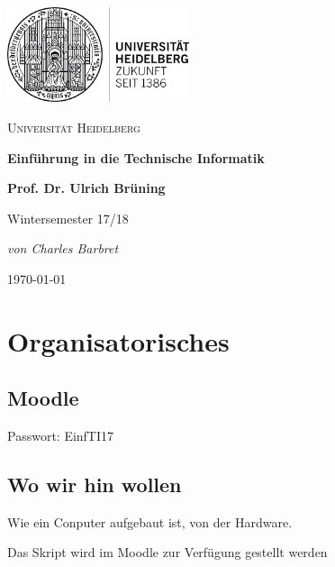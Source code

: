 \documentclass[12pt,a4paper]{article} %
\begin{document}
	\begin{titlepage} %
	\centering
	\includegraphics[width=0.40\textwidth]{UniLogo}\par\vspace{1cm}
		{\scshape\LARGE Universität Heidelberg \par}
		\vspace{1cm}
		{\huge\bfseries Einführung in die Technische Informatik \par}
		\vspace{1cm}
		{\Large\bfseries Prof. Dr. Ulrich Brüning \par}
		\vspace{1cm}
		{\huge Wintersemester 17/18 \par}
		\vspace{2cm}
		{\Large\itshape von Charles Barbret \par}
		
		\vfill

		{\large \gerDate\today\par}
	\end{titlepage}

\tableofcontents %
\newpage %


\section{Organisatorisches}
\subsection{Moodle}
Passwort: EinfTI17

\subsection{Wo wir hin wollen}
Wie ein Conputer aufgebaut ist, von der Hardware.

Das Skript wird im Moodle zur Verfügung gestellt werden
\end{document}
